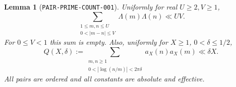 \documentclass[11pt]{article}
\newtheorem{lemma}{Lemma}
\begin{document}
\begin{lemma}[\texttt{PAIR-PRIME-COUNT-001}]\label{lem:prime-count}
Uniformly for real \(U\geq2,V\geq1\),
\begin{equation}\label{eq:prime-pair-average}
 \sum_{\substack{1\leq m,n\leq U\\0<|m-n|\leq V}}\Lambda(m)\Lambda(n)
 \ll UV.
\end{equation}
For \(0\leq V<1\) this sum is empty.
Also, uniformly for \(X\geq1\), \(0<\delta\leq1/2\),
\begin{equation}\label{eq:prime-close-pairs}
 Q(X,\delta):=
 \sum_{\substack{m,n\geq1\\0<|\log(n/m)|<2\pi\delta}}
 a_X(n)a_X(m)\ll\delta X.
\end{equation}
All pairs are ordered and all constants are absolute and effective.
\end{lemma}
\end{document}
